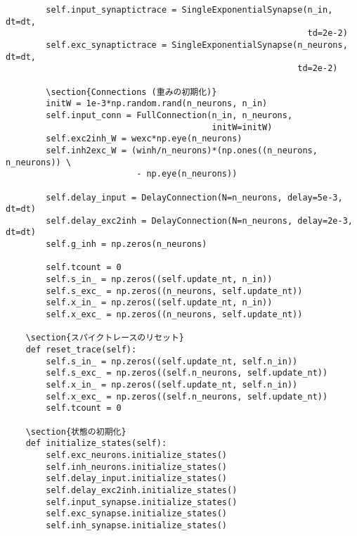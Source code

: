 \begin{verbatim}
        self.input_synaptictrace = SingleExponentialSynapse(n_in, dt=dt,
                                                            td=2e-2)
        self.exc_synaptictrace = SingleExponentialSynapse(n_neurons, dt=dt,
                                                          td=2e-2)
        
        \section{Connections (重みの初期化)}
        initW = 1e-3*np.random.rand(n_neurons, n_in)
        self.input_conn = FullConnection(n_in, n_neurons,
                                         initW=initW)
        self.exc2inh_W = wexc*np.eye(n_neurons)
        self.inh2exc_W = (winh/n_neurons)*(np.ones((n_neurons, n_neurons)) \
                          - np.eye(n_neurons))
        
        self.delay_input = DelayConnection(N=n_neurons, delay=5e-3, dt=dt)
        self.delay_exc2inh = DelayConnection(N=n_neurons, delay=2e-3, dt=dt)
        self.g_inh = np.zeros(n_neurons)
        
        self.tcount = 0
        self.s_in_ = np.zeros((self.update_nt, n_in)) 
        self.s_exc_ = np.zeros((n_neurons, self.update_nt))
        self.x_in_ = np.zeros((self.update_nt, n_in)) 
        self.x_exc_ = np.zeros((n_neurons, self.update_nt))
        
    \section{スパイクトレースのリセット}
    def reset_trace(self):
        self.s_in_ = np.zeros((self.update_nt, self.n_in)) 
        self.s_exc_ = np.zeros((self.n_neurons, self.update_nt))
        self.x_in_ = np.zeros((self.update_nt, self.n_in)) 
        self.x_exc_ = np.zeros((self.n_neurons, self.update_nt))
        self.tcount = 0
    
    \section{状態の初期化}
    def initialize_states(self):
        self.exc_neurons.initialize_states()
        self.inh_neurons.initialize_states()
        self.delay_input.initialize_states()
        self.delay_exc2inh.initialize_states()
        self.input_synapse.initialize_states()
        self.exc_synapse.initialize_states()
        self.inh_synapse.initialize_states()
        

\end{verbatim}
